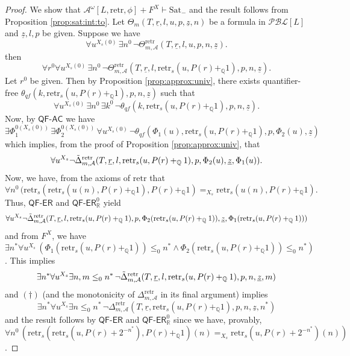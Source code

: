 \documentclass[11pt]{amsart}
\theoremstyle{definition}
\theoremstyle{remark}
\def\QQ{\mathbb{Q}}
\def\RR{\mathbb{R}}
\newcommand{\QFAC}{\textsf{QF}\mbox{-}\textsf{AC}}
\newcommand{\QFER}{\textsf{QF}\mbox{-}\textsf{ER}}
\begin{document}
\begin{proof}
We show that $\mathcal{A}^\omega[L,\mathrm{retr},\phi]+F^X \vdash\mathrm{Sat}_{-}$ and the result follows from Proposition \ref{prop:sat:int:to}. Let $\Theta_m(T,\underline{r},l,u,p,\underline{z},n)$ be a formula in $\mathcal{PBL}[L]$ and $\underline{z},l,p$ be given. Suppose we have
    \[
  \forall u^{X_s(0)}\, \exists n^0\, \neg\Theta^\mathrm{retr}_{m,\mathcal{A}}(T,\underline{r},l,u,p,n,\underline{z}).
  \]
  then 
  \[
  \forall r^0 \forall u^{X_s(0)}\, \exists n^0\, \neg\Theta^\mathrm{retr}_{m,\mathcal{A}}(T,\underline{r},l,\mathrm{retr}_s(u,P(r)+_\QQ1),p,n,\underline{z}).  \]
 Let $r^0$ be given. Then by Proposition \ref{prop:approx:univ}, there exists quantifier-free $\theta_{qf}(k,\mathrm{retr}_s(u,P(r)+_\QQ1),p,n,\underline{z})$ such that 
   \[
  \forall u^{X_s(0)}\, \exists n^0\, \exists k^0\,\neg\theta_{qf}(k,\mathrm{retr}_s(u,P(r)+_\QQ1),p,n,\underline{z}).
  \]
  Now, by $\QFAC$ we have 
   \[
 \exists \Phi_1^{0(X_s(0))}\,\exists \Phi_2^{0(X_s(0))}\,\forall u^{X_s(0)}\,\neg\theta_{qf}(\Phi_1(u),\mathrm{retr}_s(u,P(r)+_\QQ1),p,\Phi_2(u),\underline{z})
  \]
  which implies, from the proof of Proposition \ref{prop:approx:univ}, that
     \[
 \forall u^{X_s}\neg \Tilde{\Delta}^\mathrm{retr}_{m,\mathcal{A}}(T,\underline{r},l,\mathrm{retr}_s(u,P(r)+_\QQ1),p,\Phi_2(u),\underline{z},\Phi_1(u)).
  \]
Now, we have, from the axioms of $\mathrm{retr}$ that 
\[
\forall n^0\, (\mathrm{retr}_s(\mathrm{retr}_s(u(n),P(r)+_\QQ1),P(r)+_\QQ1) =_{X_s} \mathrm{retr}_s(u(n),P(r)+_\QQ1).
\]
Thus, $\QFER$ and $\QFER^0_\RR$ yield
   \[
 \forall u^{X_s}\neg \Tilde{\Delta}^\mathrm{retr}_{m,\mathcal{A}}(T,\underline{r},l,\mathrm{retr}_s(u,P(r)+_\QQ1),p,\Phi_2(\mathrm{retr}_s(u,P(r)+_\QQ1)),\underline{z},\Phi_1(\mathrm{retr}_s(u,P(r)+_\QQ1)))
  \]
and from $F^X$, we have $\exists n^* \forall u^{X_s}\,(\Phi_1(\mathrm{retr}_s(u,P(r)+_\QQ1)) \le_0 n^*\land \Phi_2(\mathrm{retr}_s(u,P(r)+_\QQ1)) \le_0 n^*)$. This implies
\[
\exists n^* \forall u^{X_s} \exists n,m \le_0 n^*\,\neg \Tilde{\Delta}^\mathrm{retr}_{m,\mathcal{A}}(T,\underline{r},l,\mathrm{retr}_s(u,P(r)+_\QQ1),p,n,\underline{z},m)
\]
and $(\dagger)$ (and the monotonicity of $\Delta^\mathrm{retr}_{m,\mathcal{A}}$ in its final argument) implies 
\[
\exists n^* \forall u^{X_s} \exists n \le_0 n^*\,\neg \Delta^\mathrm{retr}_{m,\mathcal{A}}(T,\underline{r},\mathrm{retr}_s(u,P(r)+_\QQ1),p,n,\underline{z},n^*)
\]
and the result follows by $\QFER$ and $\QFER^0_\RR$ since we have, provably, $\forall n^0\,(\mathrm{retr}_s(\mathrm{retr}_s(u,P(r)+2^{-n^*}),P(r)+_\QQ1)(n) =_{X_s} \mathrm{retr}_s(u,P(r)+2^{-n^*})(n))$.               
\end{proof}
\end{document}
